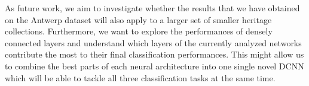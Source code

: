 As future work, we aim to investigate whether the results that we have obtained on the Antwerp dataset will also apply to a larger set of smaller heritage collections. Furthermore, we want to explore the performances of densely connected layers \cite{huang2017densely} and understand which layers of the currently analyzed networks contribute the most to their final classification performances. This might allow us to combine the best parts of each neural architecture into one single novel DCNN which will be able to tackle all three classification tasks at the same time. 


